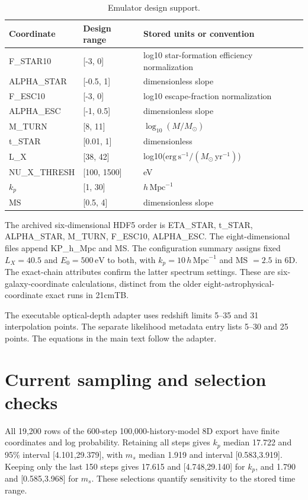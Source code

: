 \begin{table}[t]
\caption{Emulator design support.}
\label{tab:parameters}
\centering\small
\begin{tabular}{p{}p{}p{}}
\toprule
Coordinate & Design range & Stored units or convention \\
\midrule
F\_STAR10 & {[}-3, 0{]} & log10 star-formation efficiency normalization \\
ALPHA\_STAR & {[}-0.5, 1{]} & dimensionless slope \\
F\_ESC10 & {[}-3, 0{]} & log10 escape-fraction normalization \\
ALPHA\_ESC & {[}-1, 0.5{]} & dimensionless slope \\
M\_TURN & {[}8, 11{]} & $\log_{10}(M/M_\odot)$ \\
t\_STAR & {[}0.01, 1{]} & dimensionless \\
L\_X & {[}38, 42{]} & log10($\mathrm{erg\,s^{-1}}/(M_\odot\,\mathrm{yr^{-1}})$) \\
NU\_X\_THRESH & {[}100, 1500{]} & eV \\
\ensuremath{k_p} & {[}1, 30{]} & $h\,\mathrm{Mpc}^{-1}$ \\
MS & {[}0.5, 4{]} & dimensionless slope \\
\bottomrule
\end{tabular}
\end{table}

The archived six-dimensional HDF5 order is ETA\_STAR, t\_STAR, ALPHA\_STAR, M\_TURN, F\_ESC10, ALPHA\_ESC. The eight-dimensional files append KP\_h\_Mpc and MS. The configuration summary assigns fixed $L_X=40.5$ and $E_0=500\,\mathrm{eV}$ to both, with $k_p=10\,h\,\mathrm{Mpc}^{-1}$ and MS $=2.5$ in 6D. The exact-chain attributes confirm the latter spectrum settings. These are six-galaxy-coordinate calculations, distinct from the older eight-astrophysical-coordinate exact runs in 21cmTB.


The executable optical-depth adapter uses redshift limits 5--35 and 31 interpolation points. The separate likelihood metadata entry lists 5--30 and 25 points. The equations in the main text follow the adapter.

\section{Current sampling and selection checks}\label{app:current-sampling}

All 19,200 rows of the 600-step 100,000-history-model 8D export have finite coordinates and log probability. Retaining all steps gives $k_p$ median 17.722 and 95\% interval [4.101,29.379], with $m_s$ median 1.919 and interval [0.583,3.919]. Keeping only the last 150 steps gives 17.615 and [4.748,29.140] for $k_p$, and 1.790 and [0.585,3.968] for $m_s$. These selections quantify sensitivity to the stored time range.

